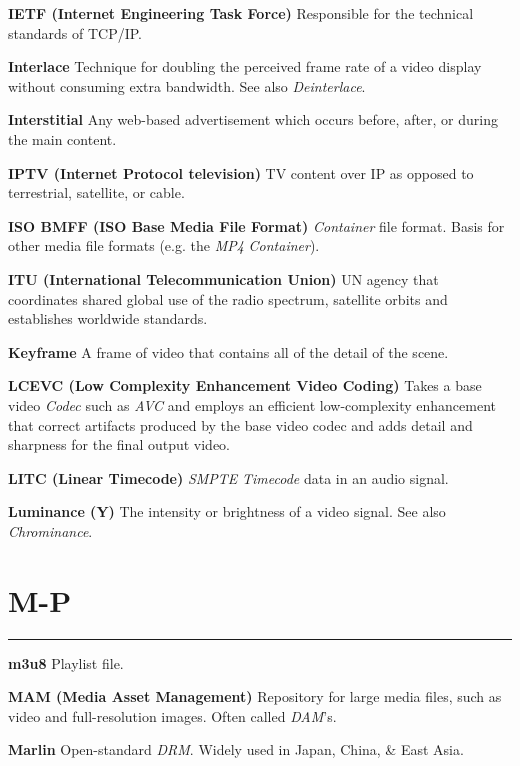 \smallskip
\textbf{IETF (Internet Engineering Task Force)}
Responsible for the technical standards of TCP/IP.

\smallskip
\textbf{Interlace}
Technique for doubling the perceived frame rate of a video display without consuming extra bandwidth. See also \textit{Deinterlace}.

\smallskip
\textbf{Interstitial}
Any web-based advertisement which occurs before, after, or during the main content.

\smallskip
\textbf{IPTV (Internet Protocol television)}
TV content over IP as opposed to terrestrial, satellite, or cable.

\smallskip
\textbf{ISO BMFF (ISO Base Media File Format)}
\textit{Container} file format.  Basis for other media file formats (e.g. the \textit{MP4} \textit{Container}).

\smallskip
\textbf{ITU (International Telecommunication Union)}
UN agency that coordinates shared global use of the radio spectrum, satellite orbits and establishes worldwide standards.

\smallskip
\textbf{Keyframe}
A frame of video that contains all of the detail of the scene.

\smallskip
\textbf{LCEVC (Low Complexity Enhancement Video Coding)}
Takes a base video \textit{Codec} such as \textit{AVC} and employs an efficient low-complexity enhancement that correct artifacts produced by the base video codec and adds detail and sharpness for the final output video.

\smallskip
\textbf{LITC (Linear Timecode)}
\textit{SMPTE} \textit{Timecode} data in an audio signal.

\smallskip
\textbf{Luminance (Y)}
The intensity or brightness of a video signal. See also \textit{Chrominance}.



\section{M-P}
\hrule

\medskip
\textbf{m3u8}
Playlist file.

\smallskip
\textbf{MAM (Media Asset Management)}
Repository for large media files, such as video and full-resolution images. Often called \textit{DAM}'s.

\smallskip
\textbf{Marlin}
Open-standard \textit{DRM}. Widely used in Japan, China, \& East Asia.

